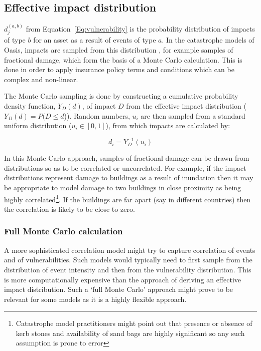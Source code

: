 \documentclass{article}
\begin{document}
\subsection{Effective impact distribution}
$d^{(a,b)}_j$ from Equation~\ref{Eq:vulnerability} is the probability distribution of impacts of type $b$ for an asset as a result of events of type $a$. In the catastrophe models of Oasis, impacts are sampled from this distribution \cite{OasisFinancialModule}, for example samples of fractional damage, which form the basis of a Monte Carlo calculation. This is done in order to apply insurance policy terms and conditions which can be complex and non-linear.

The Monte Carlo sampling is done by constructing a cumulative probability density function, $Y_D(d)$, of impact $D$ from the effective impact distribution ($Y_D(d) = P(D \le d$)). Random numbers, $u_i$ are then sampled from a standard uniform distribution ($u_i \in [0, 1]$), from which impacts are calculated by:

\begin{equation}
    \label{Eq:sampling}
    d_i = Y^{-1}_D(u_i)
\end{equation}

In this Monte Carlo approach, samples of fractional damage can be drawn from distributions so as to be correlated or uncorrelated. For example, if the impact distributions represent damage to buildings as a result of inundation then it may be appropriate to model damage to two buildings in close proximity as being highly correlated\footnote{Catastrophe model practitioners might point out that presence or absence of kerb stones and availability of sand bags are highly significant so any such assumption is prone to error}. If the buildings are far apart (say in different countries) then the correlation is likely to be close to zero.

\subsubsection{Full Monte Carlo calculation}
A more sophisticated correlation model might try to capture correlation of events and of vulnerabilities. Such models would typically need to first sample from the distribution of event intensity and then from the vulnerability distribution. This is more computationally expensive than the approach of deriving an effective impact distribution. Such a `full Monte Carlo' approach might prove to be relevant for some models as it is a highly flexible approach.
\end{document}
